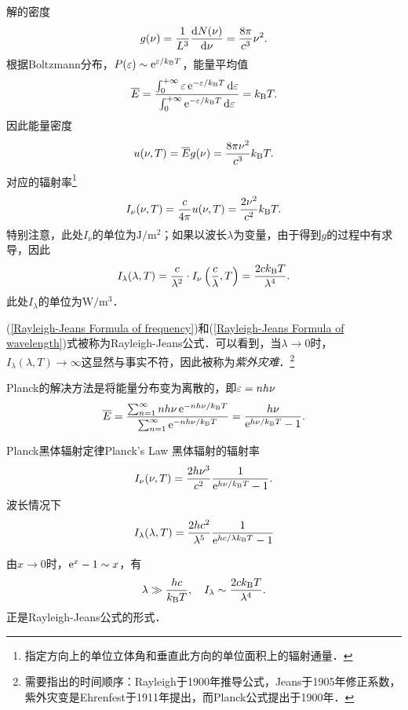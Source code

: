 解的密度
\[
	g(\nu)=\frac1{L^3}\frac{\mathrm{d}^{\;\!\!}N(\nu)}{\mathrm{d} \nu^{\;\!\!}}=\frac{8\pi}{c^3}\nu^2.
\]
根据Boltzmann分布，$P(\varepsilon)\sim\mathop{}\!\mathrm{e}^{\varepsilon/k_{\mathrm B} T}$，能量平均值
\begin{align}
	\overline E=\frac{\textstyle\int_0^{+\infty}\varepsilon\mathop{}\!\mathrm{e}^{-\varepsilon/k_{\mathrm B} T}\mathop{}\!\mathrm{d}\varepsilon}{\textstyle\int_0^{+\infty}\mathop{}\!\mathrm{e}^{-\varepsilon/k_{\mathrm B} T}\mathop{}\!\mathrm{d}\varepsilon}=k_{\mathrm B} T.
\end{align}
因此能量密度
\[
u(\nu,T)=\overline Eg(\nu)=\frac{8\pi\nu^2}{c^3}k_{\mathrm B} T.
\]
对应的辐射率\footnote{指定方向上的单位立体角和垂直此方向的单位面积上的辐射通量．}
\begin{align}\label{Rayleigh-Jeans Formula of frequency}
	I_\nu(\nu,T)=\frac c{4\pi}u(\nu,T)=\frac{2\nu^2}{c^2}k_{\mathrm B} T.
\end{align}
特别注意，此处$I_\nu$的单位为$\si{\J\per\m\squared}$；如果以波长$\lambda$为变量，由于得到$g$的过程中有求导，因此
\begin{align}\label{Rayleigh-Jeans Formula of wavelength}
	I_\lambda(\lambda,T)=\frac{c}{\lambda^2}\cdot I_\nu\left(\frac c\lambda,T\right)=\frac{2ck_{\mathrm B} T}{\lambda^4}.
\end{align}
此处$I_\lambda$的单位为$\si{\W\per\m\cubed}$．

(\ref{Rayleigh-Jeans Formula of frequency})和(\ref{Rayleigh-Jeans Formula of wavelength})式被称为Rayleigh-Jeans公式．可以看到，当$\lambda\to0$时，$I_\lambda(\lambda,T)\to\infty$这显然与事实不符，因此被称为\textit{紫外灾难}．\footnote{需要指出的时间顺序：Rayleigh于1900年推导公式，Jeans于1905年修正系数，紫外灾变是Ehrenfest于1911年提出，而Planck公式提出于1900年．}

Planck的解决方法是将能量分布变为离散的，即$\varepsilon=nh\nu$
\begin{align}
	\overline E=\frac{\textstyle\sum_{n=1}^\infty nh\nu\mathop{}\!\mathrm{e}^{-nh\nu/k_{\mathrm B} T}}{\textstyle\sum_{n=1}^\infty\mathop{}\!\mathrm{e}^{-nh\nu/k_{\mathrm B} T}}=\frac{h\nu}{\mathop{}\!\mathrm{e}^{h\nu/k_{\mathrm B} T}-1}.
\end{align}
\begin{theorem}{Planck黑体辐射定律}{Planck's Law}
	黑体辐射的辐射率
	\begin{align}
		I_\nu(\nu,T)=\frac{2h\nu^3}{c^2}\frac{1}{\mathop{}\!\mathrm{e}^{h\nu/k_{\mathrm B} T}-1}.
	\end{align}
	波长情况下
	\begin{align}
		I_\lambda(\lambda,T)=\frac{2hc^2}{\lambda^5}\frac{1}{\mathop{}\!\mathrm{e}^{hc/\lambda k_{\mathrm B} T}-1}
	\end{align}
\end{theorem}
由$x\to0$时，$\mathop{}\!\mathrm{e}^ x-1\sim x$，有
\[
	\lambda\gg\frac{hc}{k_{\mathrm B} T},\quad I_\lambda\sim\frac{2ck_{\mathrm B} T}{\lambda^4}.
\]
正是Rayleigh-Jeans公式的形式．


